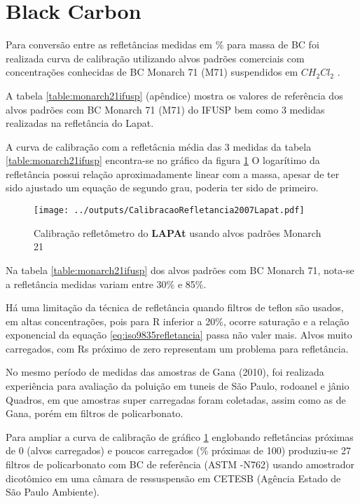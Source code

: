 \section{Black Carbon}

Para conversão entre as refletâncias medidas em \% para massa de BC foi 
realizada curva de calibração utilizando alvos padrões comerciais 
com concentrações conhecidas de BC Monarch 71 (M71) suspendidos em 
$CH_2Cl_2$ \citep{clarke1986}. 

A tabela \ref{table:monarch21ifusp} (apêndice) mostra os valores de referência 
dos alvos padrões com BC Monarch 71 (M71) do IFUSP bem como 3 medidas realizadas 
na refletância do Lapat. 

A curva de calibração com a refletâcnia média das 3 medidas da tabela 
\ref{table:monarch21ifusp} encontra-se no gráfico da figura 
\ref{fig:mocarch21calib}
O logarítimo da refletância possui relação aproximadamente linear com a massa, 
apesar de ter sido ajustado um equação de segundo grau, poderia ter sido de 
primeiro. 

\begin{figure}[H]
  \centering
  \texttt{[image: ../outputs/CalibracaoRefletancia2007Lapat.pdf]}
  \caption{Calibração refletômetro do \textbf{LAPAt} usando alvos padrões Monarch 21
          \label{fig:mocarch21calib}}
\end{figure}

Na tabela \ref{table:monarch21ifusp} dos alvos padrões com BC Monarch 71, 
nota-se a refletância medidas variam entre 30\% e 85\%.

Há uma limitação da técnica de refletância quando filtros de teflon são usados, 
em altas concentrações, pois para R inferior a 20\%, ocorre saturação
e a relação exponencial da equação \ref{eq:iso9835refletancia} 
passa não valer mais\citep{taha2007}. Alvos muito carregados, 
com Rs próximo de zero representam um problema para refletância. 

No mesmo período de medidas das amostras de Gana (2010), foi realizada 
experiência para avaliação da poluição em tuneis de São Paulo, 
rodoanel e jânio Quadros, em que amostras super carregadas foram coletadas, 
assim como as de Gana, porém em filtros de policarbonato.
 
Para ampliar a curva de calibração de gráfico \ref{fig:mocarch21calib} 
englobando refletâncias próximas de 0 (alvos carregados) e poucos carregados
(\% próximas de 100) 
produziu-se 27 filtros de policarbonato com
BC de referência (ASTM -N762) usando amostrador dicotômico em uma câmara de 
ressuspensão em CETESB (Agência Estado de São Paulo Ambiente). 

